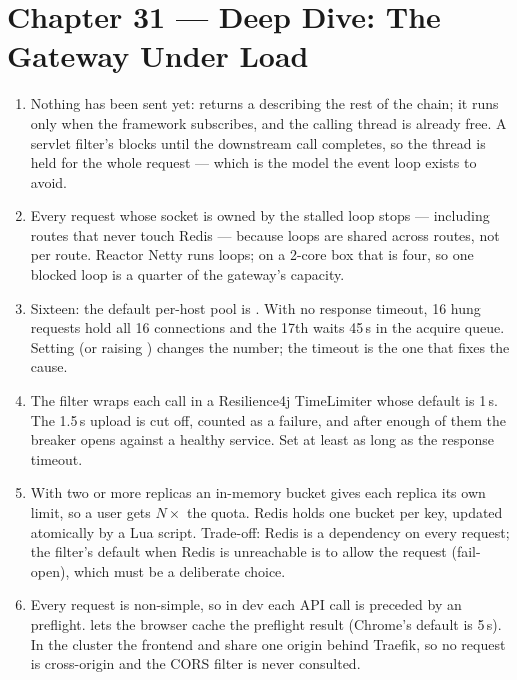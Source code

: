 \section*{Chapter 31 --- Deep Dive: The Gateway Under Load}
\begin{enumerate}
  \item Nothing has been sent yet:  returns a
   describing the rest of the chain; it runs only when the
  framework subscribes, and the calling thread is already free. A
  servlet filter's  blocks until the downstream call
  completes, so the thread is held for the whole request --- which is
  the model the event loop exists to avoid.
  \item Every request whose socket is owned by the stalled loop stops
  --- including routes that never touch Redis --- because loops are
  shared across routes, not per route. Reactor Netty runs
   loops; on a 2-core box that is four, so one
  blocked loop is a quarter of the gateway's capacity.
  \item Sixteen: the default per-host pool is . With no response timeout, 16 hung requests hold all 16
  connections and the 17th waits 45\,s in the acquire queue. Setting
   (or raising
  ) changes the number; the timeout is the
  one that fixes the cause.
  \item The filter wraps each call in a Resilience4j TimeLimiter whose
  default is 1\,s. The 1.5\,s upload is cut off, counted as a failure,
  and after enough of them the breaker opens against a healthy
  service. Set 
  at least as long as the response timeout.
  \item With two or more replicas an in-memory bucket gives each replica
  its own limit, so a user gets $N\times$ the quota. Redis holds one
  bucket per key, updated atomically by a Lua script. Trade-off: Redis
  is a dependency on every request; the filter's default when Redis is
  unreachable is to allow the request (fail-open), which must be a
  deliberate choice.
  \item Every request is non-simple, so in dev each API call is preceded
  by an  preflight.  lets the browser
  cache the preflight result (Chrome's default is 5\,s). In the cluster
  the frontend and  share one origin behind Traefik, so no
  request is cross-origin and the CORS filter is never consulted.
\end{enumerate}


